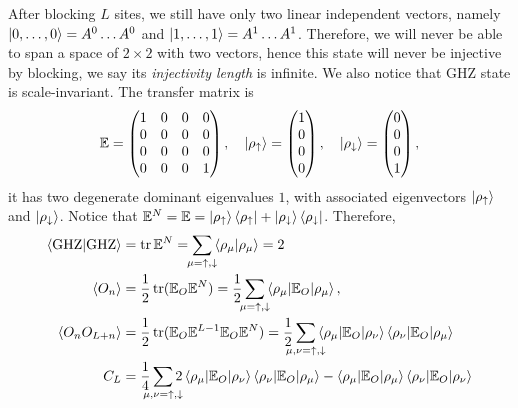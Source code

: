 \documentclass[a4paper,10pt,twoside]{article}
\DeclareMathOperator{\trace}{tr}
\theoremstyle{modern}
\begin{document}
\begin{section}{}
After blocking $L$ sites, we still have only two linear independent vectors, namely $\ket{0,\dots,0} = A^0 \dots A^0$ and $\ket{1,\dots,1} = A^1 \dots A^1$. 
Therefore, we will never be able to span a space of $2 \times 2$ with two vectors, hence this state will never be injective by blocking, we say its \emph{injectivity length} is infinite.
We also notice that GHZ state is scale-invariant.
The transfer matrix is 
\[
  \mathbb{E} = 
  \begin{pmatrix}
    1 & 0 & 0 & 0\\
    0 & 0 & 0 & 0\\
    0 & 0 & 0 & 0\\
    0 & 0 & 0 & 1
  \end{pmatrix},
  \quad
  \ket{\rho_\uparrow} = 
  \begin{pmatrix}
    1\\
    0\\
    0\\
    0\\
  \end{pmatrix},
  \quad
  \ket{\rho_\downarrow} = 
  \begin{pmatrix}
    0\\
    0\\
    0\\
    1\\
  \end{pmatrix},
\]
it has two degenerate dominant eigenvalues $1$, with associated eigenvectors $\ket{\rho_\uparrow}$ and $\ket{\rho_\downarrow}$.
Notice that $\mathbb{E}^N =  \mathbb{E} = \ket{\rho_\uparrow}\bra{\rho_\uparrow} + \ket{\rho_\downarrow}\bra{\rho_\downarrow}$.
Therefore,
\begin{align*}
  \braket{{\rm GHZ} | {\rm GHZ}} &= \trace \mathbb{E}^N =  \sum_{\mathclap{\mu = \uparrow,\downarrow}}  \braket{\rho_\mu | \rho_\mu} = 2 \\
  \braket{O_n} &= \frac{1}{2}\trace({\mathbb{E}_O \mathbb{E}^N}) = \frac{1}{2} \sum_{\mathclap{\mu = \uparrow,\downarrow}}  \braket{\rho_\mu | \mathbb{E}_O | \rho_\mu}, \\
  \braket{O_n O_{L+n}} &= \frac{1}{2}\trace({\mathbb{E}_O \mathbb{E}^{L-1} \mathbb{E}_O \mathbb{E}^N}) =  \frac{1}{2}\sum_{\mathclap{\mu,\nu = \uparrow,\downarrow}} \braket{\rho_\mu | \mathbb{E}_O | \rho_\nu} \braket{\rho_\nu | \mathbb{E}_O | \rho_\mu}  \\
  C_L &=  \frac{1}{4} \sum_{\mathclap{\mu,\nu = \uparrow,\downarrow}} 2 \braket{\rho_\mu | \mathbb{E}_O | \rho_\nu}\braket{\rho_\nu | \mathbb{E}_O | \rho_\mu} - \braket{\rho_\mu | \mathbb{E}_O | \rho_\mu}\braket{\rho_\nu | \mathbb{E}_O | \rho_\nu}\\

\end{align*}
\end{section}
\end{document}
